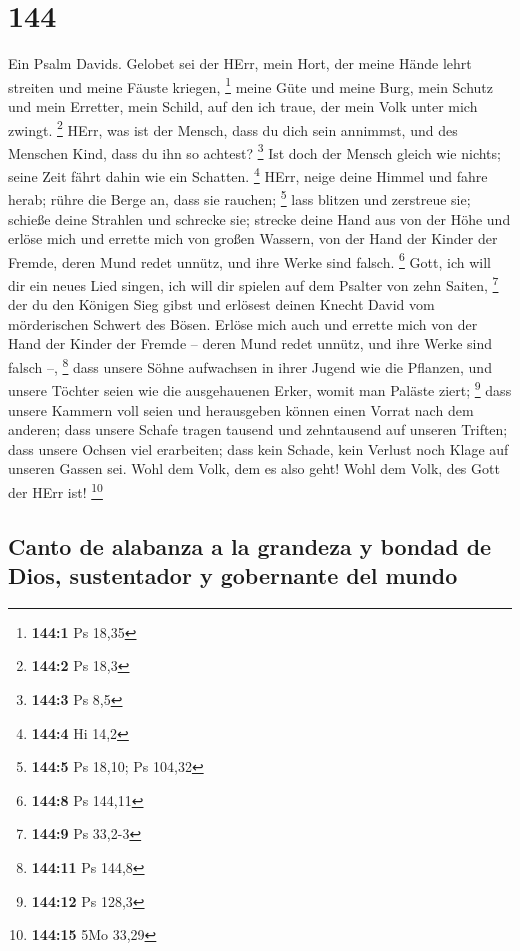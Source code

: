 \hypertarget{section-143}{%
\section{144}\label{section-143}}

 Ein Psalm Davids. Gelobet sei der HErr, mein Hort, der
meine Hände lehrt streiten und meine Fäuste kriegen, \footnote{\textbf{144:1}
  Ps 18,35}  meine Güte und meine Burg, mein Schutz und
mein Erretter, mein Schild, auf den ich traue, der mein Volk unter mich
zwingt. \footnote{\textbf{144:2} Ps 18,3}  HErr, was ist
der Mensch, dass du dich sein annimmst, und des Menschen Kind, dass du
ihn so achtest? \footnote{\textbf{144:3} Ps 8,5}  Ist doch
der Mensch gleich wie nichts; seine Zeit fährt dahin wie ein Schatten.
\footnote{\textbf{144:4} Hi 14,2}  HErr, neige deine
Himmel und fahre herab; rühre die Berge an, dass sie rauchen;
\footnote{\textbf{144:5} Ps 18,10; Ps 104,32}  lass
blitzen und zerstreue sie; schieße deine Strahlen und schrecke sie;
 strecke deine Hand aus von der Höhe und erlöse mich und
errette mich von großen Wassern, von der Hand der Kinder der Fremde,
 deren Mund redet unnütz, und ihre Werke sind falsch.
\footnote{\textbf{144:8} Ps 144,11}  Gott, ich will dir
ein neues Lied singen, ich will dir spielen auf dem Psalter von zehn
Saiten, \footnote{\textbf{144:9} Ps 33,2-3}  der du den
Königen Sieg gibst und erlösest deinen Knecht David vom mörderischen
Schwert des Bösen.  Erlöse mich auch und errette mich von
der Hand der Kinder der Fremde -- deren Mund redet unnütz, und ihre
Werke sind falsch --, \footnote{\textbf{144:11} Ps 144,8}
 dass unsere Söhne aufwachsen in ihrer Jugend wie die
Pflanzen, und unsere Töchter seien wie die ausgehauenen Erker, womit man
Paläste ziert; \footnote{\textbf{144:12} Ps 128,3}  dass
unsere Kammern voll seien und herausgeben können einen Vorrat nach dem
anderen; dass unsere Schafe tragen tausend und zehntausend auf unseren
Triften;  dass unsere Ochsen viel erarbeiten; dass kein
Schade, kein Verlust noch Klage auf unseren Gassen sei. 
Wohl dem Volk, dem es also geht! Wohl dem Volk, des Gott der HErr ist!
\footnote{\textbf{144:15} 5Mo 33,29}

\hypertarget{canto-de-alabanza-a-la-grandeza-y-bondad-de-dios-sustentador-y-gobernante-del-mundo}{%
\subsection{Canto de alabanza a la grandeza y bondad de Dios,
sustentador y gobernante del
mundo}\label{canto-de-alabanza-a-la-grandeza-y-bondad-de-dios-sustentador-y-gobernante-del-mundo}}

